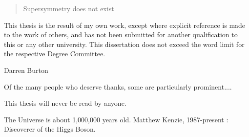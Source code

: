 
\begin{abstract}%
  Supersymmetry does not exist
  \end{abstract}


\begin{declaration}
  This thesis is the result of my own work, except where explicit
  reference is made to the work of others, and has not been submitted
  for another qualification to this or any other university. This
  dissertation does not exceed the word limit for the respective Degree
  Committee.
  \vspace*{1cm}
  \begin{flushright}
    Darren Burton
  \end{flushright}
\end{declaration}


\begin{acknowledgements}
  Of the many people who deserve thanks, some are particularly prominent....
\end{acknowledgements}


\begin{preface}
  This thesis will never be read by anyone. 

  \noindent
  
\end{preface}

\tableofcontents

\frontquote%
  {The Universe is about 1,000,000 years old.}%
  {Matthew Kenzie, 1987-present : Discoverer of the Higgs Boson.}

